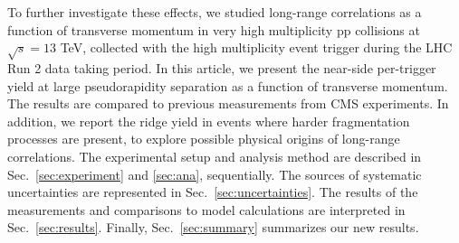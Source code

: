 % 

To further investigate these effects, we studied long-range correlations as a function of transverse momentum in very high multiplicity pp collisions at $\sqrt{s} =13$ TeV, collected with the high multiplicity event trigger during the LHC Run 2 data taking period. In this article, we present the near-side per-trigger yield at large pseudorapidity separation as a function of transverse momentum. The results are compared to previous measurements from CMS experiments. In addition, we report the ridge yield in events where harder fragmentation processes are present, to explore possible physical origins of long-range correlations.
The experimental setup and analysis method are described in Sec.~\ref{sec:experiment} and \ref{sec:ana}, sequentially.  The sources of systematic uncertainties are represented in Sec.~\ref{sec:uncertainties}. The results of the measurements and comparisons to model calculations are interpreted in Sec.~\ref{sec:results}. Finally, Sec.~\ref{sec:summary} summarizes our new results.

